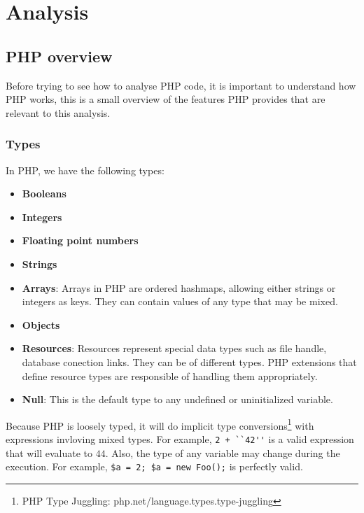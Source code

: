 \documentclass[a4paper]{article}
\begin{document}

\section{Analysis}
\subsection{PHP overview}
Before trying to see how to analyse PHP code, it is important to understand how PHP works,
this is a small overview of the features PHP provides that are relevant to this analysis.
\subsubsection{Types}
In PHP, we have the following types:
\begin{itemize}
  \item \textbf{Booleans}
  \item \textbf{Integers}
  \item \textbf{Floating point numbers}
  \item \textbf{Strings}
  \item \textbf{Arrays}: Arrays in PHP are ordered hashmaps, allowing either strings or
    integers as keys.  They can contain values of any type that may be mixed.
  \item \textbf{Objects}
  \item \textbf{Resources}: Resources represent special data types such as
    file handle, database conection links. They can be of different types. PHP
    extensions that define resource types are responsible of handling them
    appropriately.
  \item \textbf{Null}: This is the default type to any undefined or
    uninitialized variable.
\end{itemize}

Because PHP is loosely typed, it will do implicit type conversions\footnote{PHP
Type Juggling: php.net/language.types.type-juggling} with expressions invloving
mixed types. For example, \verb&2 + ``42''& is a valid expression that will
evaluate to $44$. Also, the type of any variable may change during the
execution.  For example, \verb&$a = 2; $a = new Foo();& is perfectly valid.
\end{document}
